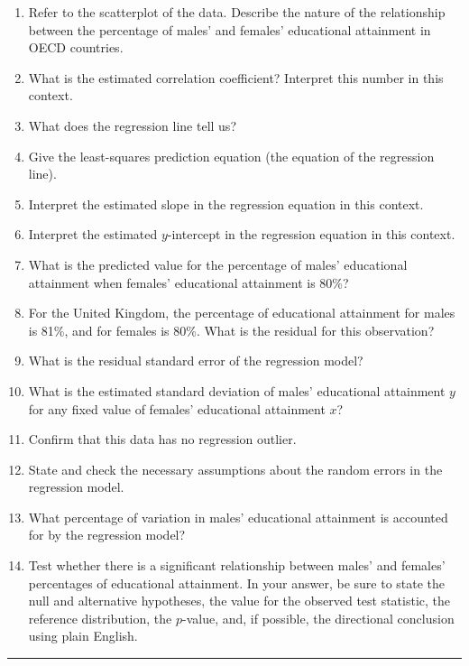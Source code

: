 \documentclass[oneside,openany]{book}
\providecommand{\tightlist}{%
  \setlength{\itemsep}{0pt}\setlength{\parskip}{0pt}}
\begin{document}
\begin{enumerate}
\def\labelenumi{\arabic{enumi}.}
\tightlist
\item
  Refer to the scatterplot of the data. Describe the nature of the relationship between the percentage of males' and females' educational attainment in OECD countries.
\item
  What is the estimated correlation coefficient? Interpret this number in this context.
\item
  What does the regression line tell us?
\item
  Give the least-squares prediction equation (the equation of the regression line).
\item
  Interpret the estimated slope in the regression equation in this context.
\item
  Interpret the estimated \(y\)-intercept in the regression equation in this context.
\item
  What is the predicted value for the percentage of males' educational attainment when females' educational attainment is 80\%?
\item
  For the United Kingdom, the percentage of educational attainment for males is 81\%, and for females is 80\%. What is the residual for this observation?
\item
  What is the residual standard error of the regression model?
\item
  What is the estimated standard deviation of males' educational attainment \(y\) for any fixed value of females' educational attainment \(x\)?
\item
  Confirm that this data has no regression outlier.
\item
  State and check the necessary assumptions about the random errors in the regression model.
\item
  What percentage of variation in males' educational attainment is accounted for by the regression model?
\item
  Test whether there is a significant relationship between males' and females' percentages of educational attainment. In your answer, be sure to state the null and alternative hypotheses, the value for the observed test statistic, the reference distribution, the \(p\)-value, and, if possible, the directional conclusion using plain English.
\end{enumerate}

\begin{center}\rule{0.5\linewidth}{0.5pt}\end{center}
\end{document}
